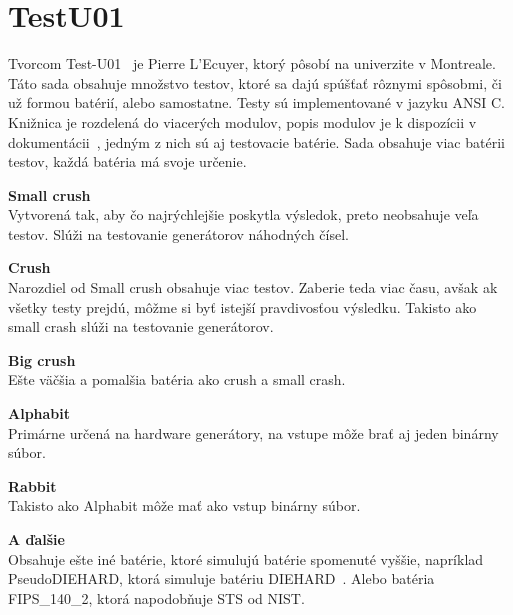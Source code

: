 \section{TestU01}
\label{sec:testu01}
Tvorcom Test-U01~\parencite{testu01} je  Pierre L’Ecuyer, ktorý pôsobí na univerzite v Montreale. Táto sada obsahuje množstvo testov, ktoré sa dajú spúšťať rôznymi spôsobmi, či už formou batérií, alebo samostatne. Testy sú implementované v jazyku ANSI C. Knižnica je rozdelená do viacerých modulov, popis modulov je k dispozícii v dokumentácii~\parencite{testu01-documentation}, jedným z nich sú aj testovacie batérie. Sada obsahuje viac batérii testov, každá batéria má svoje určenie.
\begin{myItemize}
	\item \textbf{Small crush}\\Vytvorená tak, aby čo najrýchlejšie poskytla výsledok, preto neobsahuje veľa testov. Slúži na testovanie generátorov náhodných čísel.
	\item \textbf{Crush}\\Narozdiel od Small crush obsahuje viac testov. Zaberie teda viac času, avšak ak všetky testy prejdú, môžme si byť istejší pravdivosťou výsledku. Takisto ako small crash slúži na testovanie generátorov.
	\item \textbf{Big crush}\\Ešte väčšia a pomalšia batéria ako crush a small crash. 
	\item \textbf{Alphabit}\\Primárne určená na hardware generátory, na vstupe môže brať aj jeden binárny súbor.
	\item \textbf{Rabbit}\\Takisto ako Alphabit môže mať ako vstup binárny súbor.
	\item \textbf{A ďalšie}\\Obsahuje ešte iné batérie, ktoré simulujú batérie spomenuté vyššie, napríklad PseudoDIEHARD, ktorá simuluje batériu DIEHARD~\parencite{diehard}. Alebo batéria FIPS\_140\_2, ktorá napodobňuje STS od NIST.	 
\end{myItemize}
